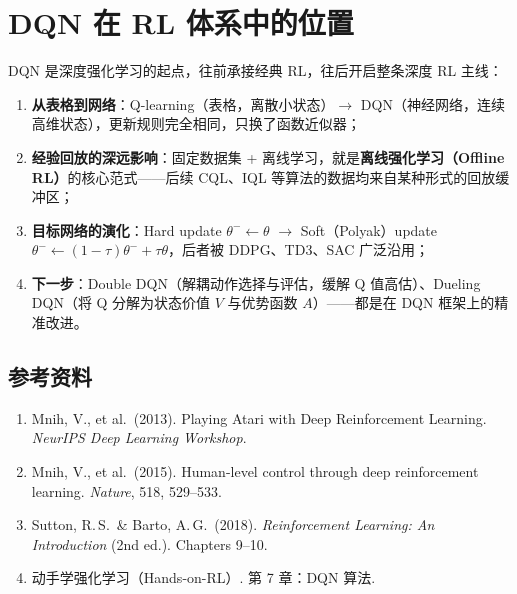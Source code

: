 \documentclass{article}
\begin{document}
\section*{DQN 在 RL 体系中的位置}

DQN 是深度强化学习的起点，往前承接经典 RL，往后开启整条深度 RL 主线：

\begin{enumerate}
  \item \textbf{从表格到网络}：Q-learning（表格，离散小状态）$\to$ DQN（神经网络，连续高维状态），更新规则完全相同，只换了函数近似器；
  \item \textbf{经验回放的深远影响}：固定数据集 + 离线学习，就是\textbf{离线强化学习（Offline RL）}的核心范式——后续 CQL、IQL 等算法的数据均来自某种形式的回放缓冲区；
  \item \textbf{目标网络的演化}：Hard update $\theta^- \leftarrow \theta$ $\to$ Soft（Polyak）update $\theta^- \leftarrow (1-\tau)\theta^- + \tau\theta$，后者被 DDPG、TD3、SAC 广泛沿用；
  \item \textbf{下一步}：Double DQN（解耦动作选择与评估，缓解 Q 值高估）、Dueling DQN（将 Q 分解为状态价值 $V$ 与优势函数 $A$）——都是在 DQN 框架上的精准改进。
\end{enumerate}

\subsection*{参考资料}

\begin{enumerate}
  \item Mnih, V., et al.\ (2013). Playing Atari with Deep Reinforcement Learning. \textit{NeurIPS Deep Learning Workshop}.
  \item Mnih, V., et al.\ (2015). Human-level control through deep reinforcement learning. \textit{Nature}, 518, 529--533.
  \item Sutton, R.\,S.\ \& Barto, A.\,G.\ (2018). \textit{Reinforcement Learning: An Introduction} (2nd ed.). Chapters 9--10.
  \item 动手学强化学习（Hands-on-RL）. 第 7 章：DQN 算法.
\end{enumerate}
\end{document}
